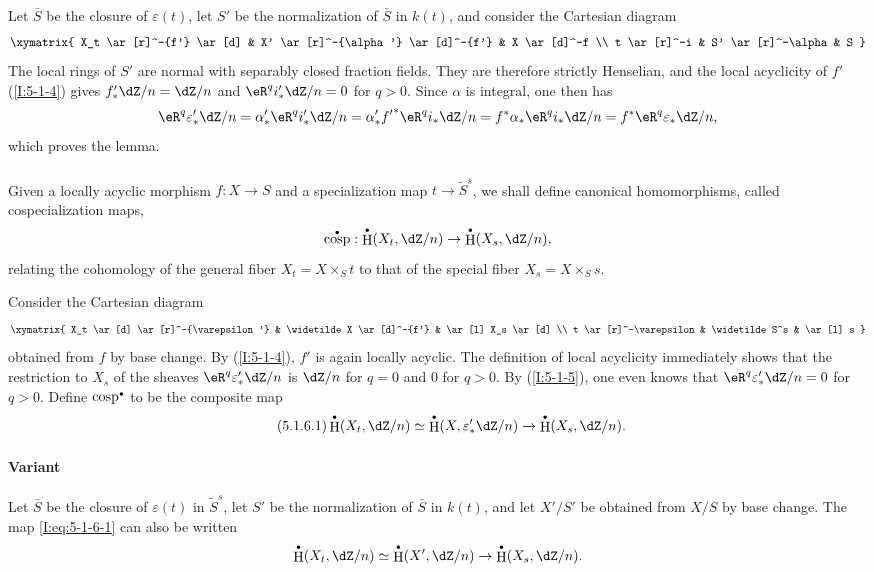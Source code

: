 \documentclass[12pt,oneside,english]{smfbook}
\DeclareMathOperator{\cosp}{cosp}
\DeclareMathOperator{\h}{H}
\let\oldbullet\bullet
\renewcommand{\bullet}{\textnormal{\tiny$\oldbullet$}}
\begin{document}
Let $\bar S$ be the closure of $\varepsilon(t)$, let $S'$ be the normalization of $\bar S$ in $k(t)$, and consider the Cartesian diagram
\[\xymatrix{
  X_t \ar[r]^-{f'} \ar[d]
    & X' \ar[r]^-{\alpha'} \ar[d]^-{f'}
    & X \ar[d]^-f \\
  t \ar[r]^-i
    & S' \ar[r]^-\alpha
    & S
}\]
The local rings of $S'$ are normal with separably closed fraction fields. They are therefore strictly Henselian, and the local acyclicity of $f'$ (\ref{I:5-1-4}) gives $f'_*\dZ/n=\dZ/n$ and $\eR^qi'_*\dZ/n=0$ for $q>0$. Since $\alpha$ is integral, one then has
\[
  \eR^q\varepsilon_*'\dZ/n
    = \alpha_*' \eR^q i_*' \dZ/n
    = \alpha_*' {f'}^* \eR^q i_* \dZ/n
    = f^* \alpha_* \eR^q i_* \dZ/n
    = f^* \eR^q \varepsilon_* \dZ/n \text{,}
\]
which proves the lemma.

\subsubsection{}\label{I:5-1-6}

Given a locally acyclic morphism $f:X\to S$ and a specialization map $t\to\widetilde S^s$, we shall define canonical homomorphisms, called cospecialization maps,
\[
  \cosp^\bullet : \h^\bullet(X_t,\dZ/n) \to \h^\bullet(X_s,\dZ/n)\text{,}
\]
relating the cohomology of the general fiber $X_t=X\times_St$ to that of the special fiber $X_s=X\times_Ss$.

Consider the Cartesian diagram
\[\xymatrix{
  X_t \ar[d] \ar[r]^-{\varepsilon'}
    & \widetilde X \ar[d]^-{f'}
    & \ar[l] X_s \ar[d] \\
  t \ar[r]^-\varepsilon
    & \widetilde S^s
    & \ar[l] s
}\]
obtained from $f$ by base change. By (\ref{I:5-1-4}), $f'$ is again locally acyclic. The definition of local acyclicity immediately shows that the restriction to $X_s$ of the sheaves $\eR^q\varepsilon'_*\dZ/n$ is $\dZ/n$ for $q=0$ and $0$ for $q>0$. By (\ref{I:5-1-5}), one even knows that $\eR^q\varepsilon'_*\dZ/n=0$ for $q>0$. Define $\cosp^\bullet$ to be the composite map
\begin{equation*}\tag{5.1.6.1}\label{I:eq:5-1-6-1}
  \h^\bullet(X_t,\dZ/n) \simeq \h^\bullet(X,\varepsilon_*' \dZ/n) \to \h^\bullet(X_s,\dZ/n) \text{.}
\end{equation*}

\paragraph{Variant}
Let $\bar S$ be the closure of $\varepsilon(t)$ in $\widetilde S^s$, let $S'$ be the normalization of $\bar S$ in $k(t)$, and let $X'/S'$ be obtained from $X/S$ by base change. The map \eqref{I:eq:5-1-6-1} can also be written
\[
  \h^\bullet(X_t,\dZ/n) \simeq \h^\bullet(X',\dZ/n) \to \h^\bullet(X_s,\dZ/n) \text{.}
\]
\end{document}
